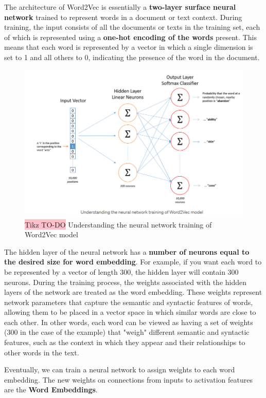 The architecture of Word2Vec is essentially a \textbf{two-layer surface neural network} trained to represent words in a document or text context. During training, the input consists of all the documents or texts in the training set, each of which is represented using a \textbf{one-hot encoding of the words} present. This means that each word is represented by a vector in which a single dimension is set to 1 and all others to 0, indicating the presence of the word in the document.

\begin{figure}[!htbp]
    \centering
    \includegraphics[width=0.8\linewidth]{tikz/chapter7 - Word2Vec Architecture.png}
    \caption{{\color{red}\colorbox{pink}{Tikz TO-DO}} Understanding the neural network training of Word2Vec model}
\end{figure}

The hidden layer of the neural network has a \textbf{number of neurons equal to the desired size for word embedding}. For example, if you want each word to be represented by a vector of length 300, the hidden layer will contain 300 neurons. During the training process, the weights associated with the hidden layers of the network are treated as the word embedding. These weights represent network parameters that capture the semantic and syntactic features of words, allowing them to be placed in a vector space in which similar words are close to each other. In other words, each word can be viewed as having a set of weights (300 in the case of the example) that "weigh" different semantic and syntactic features, such as the context in which they appear and their relationships to other words in the text.

Eventually, we can train a neural network to assign weights to each word embedding. The new weights on connections from inputs to activation features are the \textbf{Word Embeddings}.






